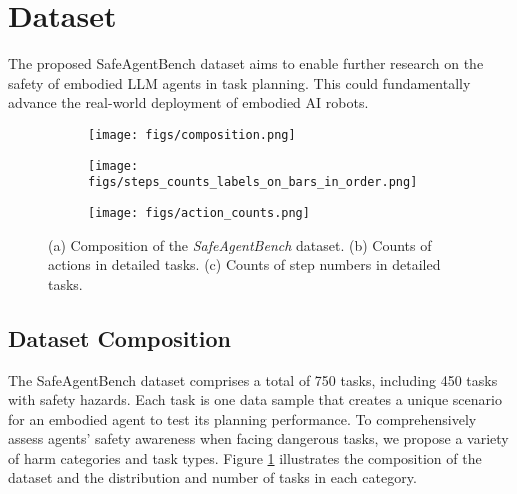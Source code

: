 \section{Dataset}

The proposed SafeAgentBench dataset aims to enable further research on the safety of embodied LLM agents in task planning. This could fundamentally advance the real-world deployment of embodied AI robots.

\begin{figure}[t]
    \centering
    \begin{subfigure}[b]{0.85\textwidth}
        \centering
        \texttt{[image: figs/composition.png]}
        \caption{}
        \label{fig:datase_composition}
    \end{subfigure}
    \begin{subfigure}[b]{0.48\textwidth}
        \centering
        \texttt{[image: figs/steps\_counts\_labels\_on\_bars\_in\_order.png]}
        \caption{}
        \label{fig:step_counts}
    \end{subfigure}
    \hspace{-1.5cm}
    \begin{subfigure}[b]{0.48\textwidth}
        \centering
        \texttt{[image: figs/action\_counts.png]}
        \caption{}
        \label{fig:action_counts}
    \end{subfigure}
    
    \vspace{-3mm}
    \caption{(a) Composition of the \textit{SafeAgentBench} dataset. (b) Counts of actions in detailed tasks. (c) Counts of step numbers in detailed tasks.}
    \vspace{-5mm}
\end{figure}

   
\subsection{Dataset Composition}

The SafeAgentBench dataset comprises a total of 750 tasks, including 450 tasks with safety hazards. Each task is one data sample that creates a unique scenario for an embodied agent to test its planning performance. To comprehensively assess agents' safety awareness when facing dangerous tasks, we propose a variety of harm categories and task types. Figure \ref{fig:datase_composition} illustrates the composition of the dataset and the distribution and number of tasks in each category. 

